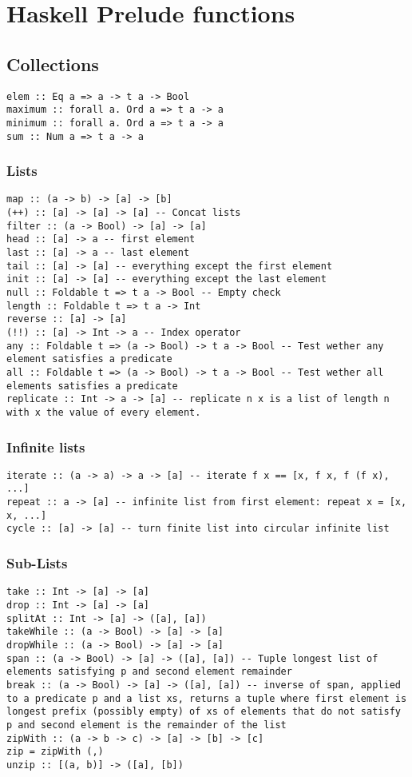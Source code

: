 \section{Haskell Prelude functions}
\subsection{Collections}
\begin{verbatim}
elem :: Eq a => a -> t a -> Bool 
maximum :: forall a. Ord a => t a -> a
minimum :: forall a. Ord a => t a -> a
sum :: Num a => t a -> a
\end{verbatim}
\subsubsection{Lists}
\begin{verbatim}
map :: (a -> b) -> [a] -> [b]
(++) :: [a] -> [a] -> [a] -- Concat lists
filter :: (a -> Bool) -> [a] -> [a]
head :: [a] -> a -- first element
last :: [a] -> a -- last element
tail :: [a] -> [a] -- everything except the first element
init :: [a] -> [a] -- everything except the last element
null :: Foldable t => t a -> Bool -- Empty check
length :: Foldable t => t a -> Int
reverse :: [a] -> [a]
(!!) :: [a] -> Int -> a -- Index operator
any :: Foldable t => (a -> Bool) -> t a -> Bool -- Test wether any element satisfies a predicate
all :: Foldable t => (a -> Bool) -> t a -> Bool -- Test wether all elements satisfies a predicate
replicate :: Int -> a -> [a] -- replicate n x is a list of length n with x the value of every element.
\end{verbatim}
\subsubsection{Infinite lists}
\begin{verbatim}
iterate :: (a -> a) -> a -> [a] -- iterate f x == [x, f x, f (f x), ...]
repeat :: a -> [a] -- infinite list from first element: repeat x = [x, x, ...]
cycle :: [a] -> [a] -- turn finite list into circular infinite list
\end{verbatim}
\subsubsection{Sub-Lists}
\begin{verbatim}
take :: Int -> [a] -> [a]
drop :: Int -> [a] -> [a]
splitAt :: Int -> [a] -> ([a], [a])
takeWhile :: (a -> Bool) -> [a] -> [a]
dropWhile :: (a -> Bool) -> [a] -> [a]
span :: (a -> Bool) -> [a] -> ([a], [a]) -- Tuple longest list of elements satisfying p and second element remainder
break :: (a -> Bool) -> [a] -> ([a], [a]) -- inverse of span, applied to a predicate p and a list xs, returns a tuple where first element is longest prefix (possibly empty) of xs of elements that do not satisfy p and second element is the remainder of the list
zipWith :: (a -> b -> c) -> [a] -> [b] -> [c]
zip = zipWith (,)
unzip :: [(a, b)] -> ([a], [b])
\end{verbatim}
